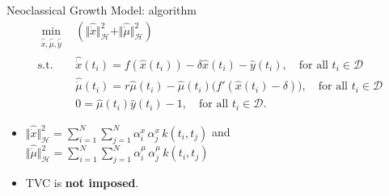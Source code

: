 \documentclass[aspectratio=169,10pt]{beamer}
\newcommand{\emphcolor}[1]{\textbf{\textcolor{emphcolorval}{#1}}}
\begin{document}
\begin{frame}{Neoclassical Growth Model: algorithm}
\[
\begin{aligned}
	\min_{\substack{
			\hat{\dot{x}}, \hat{\dot{\mu}},\hat{\dot{y}}
	}}\, & \left(
	 \Vert \hat{\dot{x}} \Vert^2_{\mathcal{H}} +
	 \Vert \hat{\dot{\mu}} \Vert^2_{\mathcal{H}}\right)\\
	\text{s.t.}~\,
	& \hat{\dot{x}}(t_i) = f(\hat{x}(t_i))- \delta \hat{x}(t_i) - \hat{y}(t_i) ,\quad\text{for all } t_i \in \mathcal{D}\\
	& \hat{\dot{\mu}}(t_i) = r\hat{\mu}(t_i)- \hat{\mu}(t_i)\big(f'(\hat{x}(t_i)-\delta)\big),\quad\text{for all } t_i \in \mathcal{D}\\
	& 0 = \hat{\mu}(t_i)\hat{y}(t_i) -1 ,\quad\text{for all } t_i \in \mathcal{D}.
\end{aligned}
\]
\begin{itemize}
	\item  $\Vert \hat{\dot{x}} \Vert^2_{\mathcal{H}} = \textstyle\sum\limits_{i=1}^N \textstyle\sum\limits_{j=1}^N \alpha^{x}_i \, \alpha^{x}_j \, k(t_i, t_j)$ and $\Vert \hat{\dot{\mu}} \Vert^2_{\mathcal{H}} = \textstyle\sum\limits_{i=1}^N \textstyle\sum\limits_{j=1}^N \alpha^{\mu}_i \, \alpha^{\mu}_j \, k(t_i, t_j)$
	\item TVC is \emphcolor{not imposed}.
\end{itemize}
\end{frame}
\end{document}
